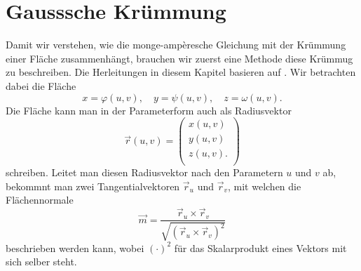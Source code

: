 %
%
%
%
\section{Gausssche Krümmung
\label{mongeampere:section:teil1}}
Damit wir verstehen, wie die monge-ampèresche Gleichung mit der 
Krümmung einer Fläche zusammenhängt, brauchen wir zuerst eine Methode diese 
Krümmug zu beschreiben.
Die Herleitungen in diesem Kapitel basieren auf \cite{mongeampere:smirnow}.
Wir betrachten dabei die Fläche
\begin{equation}
  x = \varphi(u,v), \quad y = \psi(u,v), \quad z = \omega(u,v).
  \label{mongeampere:areaparam}
\end{equation}
Die Fläche kann man in der Parameterform auch als Radiusvektor
%
\begin{equation}
  \vec r (u, v) =
  \begin{pmatrix}
    x(u,v) \\
    y(u,v) \\
    z(u,v). \\
  \end{pmatrix}
  \label{mongeampere:rad}
\end{equation}
schreiben.
Leitet man diesen Radiusvektor nach den Parametern $u$ und $v$ ab, bekommnt man zwei Tangentialvektoren
$\vec r_u$ und $\vec r_v$,
mit welchen die Flächennormale 
%
\begin{equation}
  \vec m = \frac{\vec r_u \times \vec r_v}{\!\sqrt{(\vec r_u \times \vec r_v)^2}} 
  \label{mongeampere:norm}
\end{equation}
beschrieben werden kann, wobei $(\cdot)^2$ für das Skalarprodukt eines Vektors mit sich selber steht.

